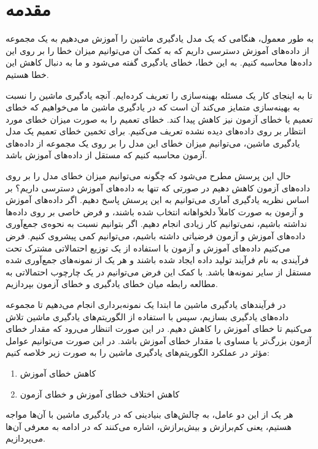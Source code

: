 \section{مقدمه}


به طور معمول، هنگامی که یک مدل یادگیری ماشین را آموزش می‌دهیم به یک مجموعه از داده‌های آموزش دسترسی داریم که به کمک آن می‌توانیم میزان خطا را بر روی این داده‌ها محاسبه کنیم. 
به این خطا، خطای یادگیری گفته می‌شود و ما به دنبال کاهش این خطا هستیم. 

تا به اینجای کار یک مسئله‌ بهینه‌سازی را تعریف کرده‌ایم. آنچه یادگیری ماشین را نسبت به بهینه‌سازی متمایز می‌کند آن است که در یادگیری ماشین ما می‌خواهیم که خطای تعمیم یا خطای آزمون نیز کاهش پیدا کند.
خطای تعمیم را به صورت میزان خطای مورد انتظار بر روی داده‌های دیده‌ نشده تعریف می‌کنیم.
برای تخمین خطای تعمیم یک مدل یادگیری ماشین، می‌توانیم میزان خطای این مدل را بر روی یک مجموعه از داده‌های آزمون محاسبه کنیم که مستقل از داده‌های آموزش باشد.

حال این پرسش مطرح می‌شود که چگونه می‌توانیم میزان خطای مدل را بر روی داده‌های آزمون کاهش دهیم در صورتی که تنها به داده‌های آموزش دسترسی داریم؟
بر اساس نظریه یادگیری آماری می‌توانیم به این پرسش پاسخ دهیم. اگر داده‌های آموزش و آزمون به صورت کاملاً دلخواهانه انتخاب شده باشند، و فرض خاصی بر روی داده‌ها نداشته باشیم، نمی‌توانیم کار زیادی انجام دهیم. 
اگر بتوانیم نسبت به نحوه‌ی جمع‌آوری داده‌های آموزش و آزمون فرضیاتی داشته باشیم، می‌توانیم کمی پیشروی کنیم. فرض می‌کنیم داده‌های آموزش و آزمون با استفاده از یک توزیع احتمالاتی مشترک تحت فرآیندی به نام فرآیند تولید داده ایجاد شده باشند و هر یک از نمونه‌های جمع‌آوری شده مستقل از سایر نمونه‌ها باشد.
با کمک این فرض می‌توانیم در یک چارچوب احتمالاتی به مطالعه‌ رابطه میان خطای یادگیری و خطای آزمون بپردازیم.

در فرآیند‌های یادگیری ماشین ما ابتدا یک نمونه‌برداری انجام می‌دهیم تا مجموعه‌ داده‌های یادگیری بسازیم، سپس با استفاده از الگوریتم‌های یادگیری ماشین تلاش می‌کنیم تا خطای آموزش را کاهش دهیم. در این صورت اتنظار می‌رود که مقدار خطای آزمون بزرگ‌تر یا مساوی با مقدار خطای آموزش باشد. در این صورت می‌توانیم عوامل مؤثر در عملکرد الگوریتم‌های یادگیری ماشین را به صورت زیر خلاصه کنیم:
\begin{enumerate}
    \item کاهش خطای آموزش
    \item کاهش اختلاف خطای‌ آموزش و خطای آزمون
\end{enumerate}
هر یک از این دو عامل، به چالش‌های بنیادینی که در یادگیری ماشین با آن‌ها مواجه هستیم، یعنی کم‌برازش و بیش‌برازش، اشاره می‌کنند که در ادامه به معرفی آن‌ها می‌پردازیم. 

